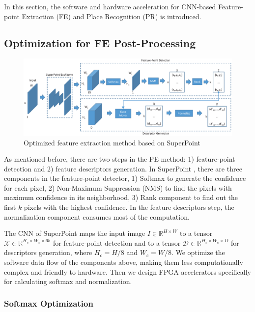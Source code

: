 \label{sec:hardsoftcodesign}
In this section, the software and hardware acceleration for CNN-based Feature-point Extraction (FE) and Place Recognition (PR) is introduced.

\subsection{Optimization for FE Post-Processing}

\begin{figure}[t]
    \centering  
    \includegraphics[width=1\linewidth]{fig/superpoint.eps}
    \caption{Optimized feature extraction method based on SuperPoint}
    \label{fig:superpoint}
\end{figure}

As mentioned before, there are two steps in the PE method: 1) feature-point detection and 2) feature descriptors generation. 
In SuperPoint \cite{detone2018superpoint}, there are three components in the feature-point detector, 1) Softmax to generate the confidence for each pixel, 2) Non-Maximum Suppression (NMS) to find the pixels with maximum confidence in its neighborhood, 3) Rank component to find out the first $k$ pixels with the highest confidence. 
In the feature descriptors step, the normalization component consumes most of the computation. 

The CNN of SuperPoint maps the input image $I\in \mathbb{R}^{H\times W}$ to a tensor $\mathcal{X}\in \mathbb{R}^{H_c\times W_c\times 65}$ for feature-point detection and to a tensor $\mathcal{D}\in \mathbb{R}^{H_c\times W_c\times D}$ for descriptors generation, where $H_c = H/8$ and $W_c = W/8$.
We optimize the software data flow of the components above, making them less computationally complex and friendly to hardware. 
Then we design FPGA accelerators specifically for calculating softmax and normalization.

\subsubsection{Softmax Optimization}
\label{sec:softmaxopt}

